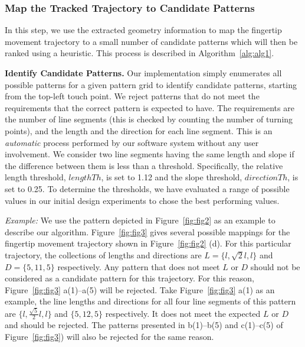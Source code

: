     \subsubsection{Map the Tracked Trajectory to Candidate Patterns\label{section:identity}}
       In this step, we use the extracted geometry information to map the fingertip movement trajectory to a small number of candidate patterns which will then be ranked using a heuristic. This process is described in Algorithm~\ref{alg:alg1}.

        \vspace{2mm}
       \noindent \textbf{Identify Candidate Patterns.} Our implementation simply enumerates all possible
        patterns for a given pattern grid to identify candidate patterns, starting from the top-left touch point.
        We reject patterns that do not meet the requirements that the correct pattern is expected to have. The requirements are the number of line segments (this is checked by counting the number of turning points), and the length and the direction for each
        line segment.
        This is an \emph{automatic} process performed by our software system without any user involvement.
       We consider two line segments having the same length and slope if the difference between them is less
       than a threshold. Specifically, the relative length threshold, $lengthTh$, is set to 1.12 and the slope threshold, $directionTh$, is set to 0.25.
       To determine the thresholds, we have evaluated a range of possible values in our initial design experiments to chose the best performing values.

       \vspace{2mm}
       \noindent \emph{Example:} We use the pattern depicted in Figure~\ref{fig:fig2} as an example to
       describe our algorithm. Figure~\ref{fig:fig3} gives several
       possible mappings for the fingertip movement trajectory shown in Figure~\ref{fig:fig2} (d). For this particular trajectory, the collections of lengths and directions are
       $L=\{l, \sqrt{2}l, l\}$ and $D=\{5, 11, 5\}$ respectively. Any pattern that does not meet $L$ or $D$ should not be considered as a candidate pattern for this trajectory.
       For this reason, Figure~\ref{fig:fig3} a(1)--a(5) will be rejected. Take Figure~\ref{fig:fig3} a(1) as an example,
       the line lengths and directions for all four line segments of this pattern are  $\{l,
       \frac{\sqrt{5}}{2}l, l\}$ and $\{5,12,5\}$ respectively. It does not meet the expected $L$ or $D$ and should be rejected.
       The patterns presented in b(1)--b(5) and c(1)--c(5) of Figure~\ref{fig:fig3}) will
       also be rejected for the same reason.

